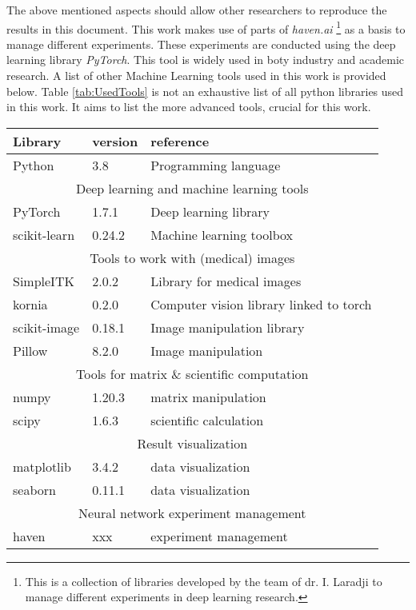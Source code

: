 The above mentioned aspects should allow other researchers to reproduce the results in this document.
This work makes use of parts of \textit{haven.ai} \footnote{This is a collection of libraries developed by the team of dr. I. Laradji to manage different experiments in deep learning research.} 
as a basis to manage different experiments.
These experiments are conducted using the deep learning library \textit{PyTorch}.
This tool is widely used in boty industry and academic research.
A list of other Machine Learning tools used in this work is provided below.
Table \ref{tab:UsedTools} is not an exhaustive list of all  python libraries used in this work.
It aims to list the more advanced tools, crucial for this work.

\begin{SCtable}[\sidecaptionrelwidth][h]
 
  \begin{tabular}{ p{2cm} l l } 
   \hline
   \hline
   \textbf{Library} & \textbf{version} & \textbf{reference}    \\
   \hline 
  Python & 3.8 & Programming language \\
   \hline
   \multicolumn{3}{c}{Deep learning and machine learning tools} \\
   \hline
   PyTorch & 1.7.1 & Deep learning library \\ 
   scikit-learn & 0.24.2 & Machine learning toolbox \\
   \hline
   \multicolumn{3}{c}{Tools to work with (medical) images} \\
   \hline
   SimpleITK & 2.0.2 & Library for medical images \\ 
   kornia & 0.2.0 & Computer vision library linked to torch \\
   scikit-image & 0.18.1 & Image manipulation library \\
   Pillow & 8.2.0 & Image manipulation\\
   \hline
   \multicolumn{3}{c}{Tools for matrix \& scientific computation} \\
   \hline
   numpy & 1.20.3 & matrix manipulation \\
   scipy & 1.6.3 & scientific calculation \\
   \hline
   \multicolumn{3}{c}{Result visualization} \\
   \hline
   matplotlib & 3.4.2 & data visualization \\ 
   seaborn & 0.11.1 & data visualization \\
   \multicolumn{3}{c}{Neural network experiment management} \\
   \hline
   haven & xxx & experiment management \\ 
   \hline
   \hline
  \end{tabular}
  \caption{Python libraries used. \label{tab:UsedTools}}

\end{SCtable}

